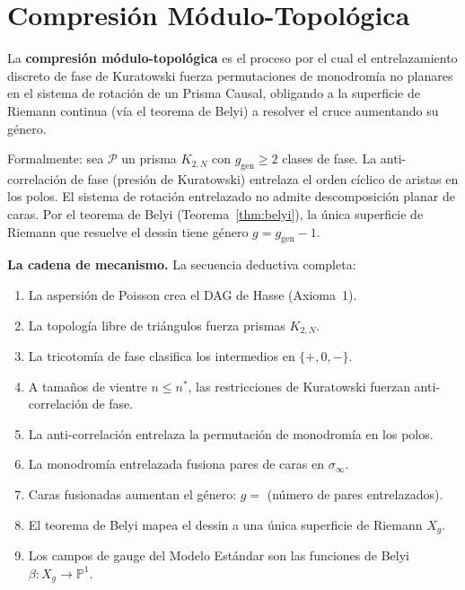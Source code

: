 \documentclass[11pt, a4paper, openany]{book}
\begin{document}
\section{Compresión Módulo-Topológica}
\label{sec:compresion}

\begin{definition}
\label{def:compresion}
La \textbf{compresión módulo-topológica} es el proceso por el cual el
entrelazamiento discreto de fase de Kuratowski fuerza permutaciones de
monodromía no planares en el sistema de rotación de un Prisma Causal,
obligando a la superficie de Riemann continua (vía el teorema de
Belyi) a resolver el cruce aumentando su género.

Formalmente: sea $\mathcal{P}$ un prisma $K_{2,N}$ con
$g_{\mathrm{gen}} \ge 2$ clases de fase. La anti-correlación de fase
(presión de Kuratowski) entrelaza el orden cíclico de aristas en los
polos. El sistema de rotación entrelazado no admite descomposición
planar de caras. Por el teorema de Belyi
(Teorema~\ref{thm:belyi}), la única superficie de Riemann que
resuelve el dessin tiene género $g = g_{\mathrm{gen}} - 1$.
\end{definition}

\noindent
\textbf{La cadena de mecanismo.} La secuencia deductiva completa:
\begin{enumerate}
  \item La aspersión de Poisson crea el DAG de Hasse (Axioma~1).
  \item La topología libre de triángulos fuerza prismas $K_{2,N}$.
  \item La tricotomía de fase clasifica los intermedios en $\{+, 0, -\}$.
  \item A tamaños de vientre $n \le n^*$, las restricciones de
        Kuratowski fuerzan anti-correlación de fase.
  \item La anti-correlación entrelaza la permutación de monodromía
        en los polos.
  \item La monodromía entrelazada fusiona pares de caras en
        $\sigma_\infty$.
  \item Caras fusionadas aumentan el género: $g =$ (número de pares
        entrelazados).
  \item El teorema de Belyi mapea el dessin a una única superficie
        de Riemann $X_g$.
  \item Los campos de gauge del Modelo Estándar son las funciones de
        Belyi $\beta \colon X_g \to \mathbb{P}^1$.
\end{enumerate}
\end{document}
